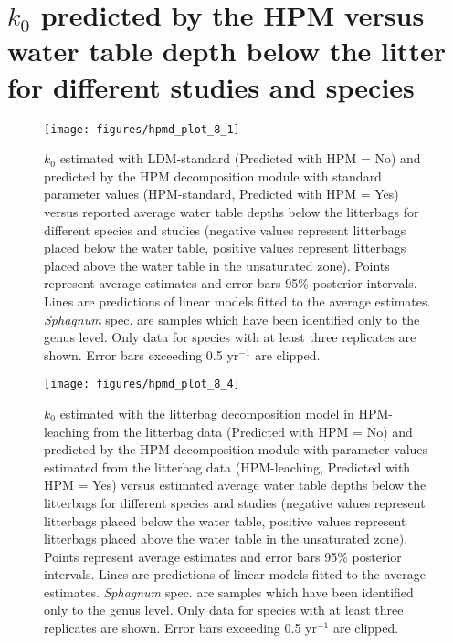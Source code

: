 \documentclass[
  12pt,
]{article}
\begin{document}
\hypertarget{sup-8}{%
\section{\texorpdfstring{\(k_0\) predicted by the HPM versus water table depth below the litter for different studies and species}{k\_0 predicted by the HPM versus water table depth below the litter for different studies and species}}\label{sup-8}}



\begin{figure}[H]

{\centering \texttt{[image: figures/hpmd\_plot\_8\_1]} 

}

\caption{\(k_0\) estimated with LDM-standard (Predicted with HPM = No) and predicted by the HPM decomposition module with standard parameter values (HPM-standard, Predicted with HPM = Yes) versus reported average water table depths below the litterbags for different species and studies (negative values represent litterbags placed below the water table, positive values represent litterbags placed above the water table in the unsaturated zone). Points represent average estimates and error bars 95\% posterior intervals. Lines are predictions of linear models fitted to the average estimates. \emph{Sphagnum} spec. are samples which have been identified only to the genus level. Only data for species with at least three replicates are shown. Error bars exceeding 0.5 yr\(^{-1}\) are clipped.}\label{fig:sup-hpmd-plot-8-1}
\end{figure}



\begin{figure}[H]

{\centering \texttt{[image: figures/hpmd\_plot\_8\_4]} 

}

\caption{\(k_0\) estimated with the litterbag decomposition model in HPM-leaching from the litterbag data (Predicted with HPM = No) and predicted by the HPM decomposition module with parameter values estimated from the litterbag data (HPM-leaching, Predicted with HPM = Yes) versus estimated average water table depths below the litterbags for different species and studies (negative values represent litterbags placed below the water table, positive values represent litterbags placed above the water table in the unsaturated zone). Points represent average estimates and error bars 95\% posterior intervals. Lines are predictions of linear models fitted to the average estimates. \emph{Sphagnum} spec. are samples which have been identified only to the genus level. Only data for species with at least three replicates are shown. Error bars exceeding 0.5 yr\(^{-1}\) are clipped.}\label{fig:sup-hpmd-plot-8-4}
\end{figure}
\end{document}

